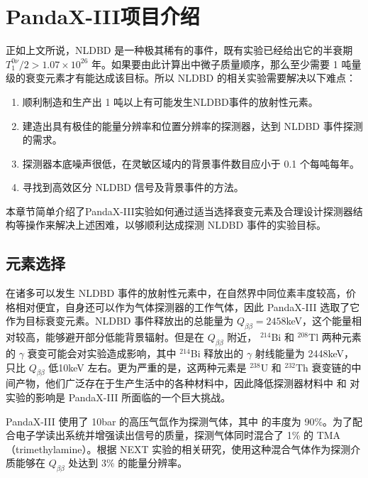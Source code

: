 \chapter{PandaX-III项目介绍}
\label{chapter:intro}

正如上文所说，NLDBD 是一种极其稀有的事件，既有实验已经给出它的半衰期 $T^{0\nu}_1/2>1.07\times10^{26}$ 年。如果要由此计算出中微子质量顺序，那么至少需要 1 吨量级的衰变元素才有能达成该目标。所以 NLDBD 的相关实验需要解决以下难点：

\vspace{0.4cm}
\begin{enumerate}
    \item 顺利制造和生产出 1 吨以上有可能发生NLDBD事件的放射性元素。
    \item 建造出具有极佳的能量分辨率和位置分辨率的探测器，达到 NLDBD 事件探测的需求。
    \item 探测器本底噪声很低，在灵敏区域内的背景事件数目应小于 0.1 个每吨每年。
    \item 寻找到高效区分 NLDBD 信号及背景事件的方法。
\end{enumerate}
\vspace{0.4cm}

本章节简单介绍了PandaX-III实验如何通过适当选择衰变元素及合理设计探测器结构等操作来解决上述困难，以够顺利达成探测 NLDBD 事件的实验目标。

\section{元素选择}

在诸多可以发生 NLDBD 事件的放射性元素中，\xeots 在自然界中同位素丰度较高，价格相对便宜，自身还可以作为气体探测器的工作气体，因此 PandaX-III 选取了它作为目标衰变元素。\xeots NLDBD 事件释放出的总能量为 $Q_{\beta\beta}=2458$keV，这个能量相对较高，能够避开部分低能背景辐射。但是在 $Q_{\beta\beta}$ 附近， $^{214}$Bi 和 $^{208}$Tl 两种元素的 $\gamma$ 衰变可能会对实验造成影响，其中 $^{214}$Bi 释放出的 $\gamma$ 射线能量为 2448keV，只比 $Q_{\beta\beta}$ 低10keV 左右。更为严重的是，这两种元素是 $^{238}$U 和 $^{232}$Th 衰变链的中间产物，他们广泛存在于生产生活中的各种材料中，因此降低探测器材料中 \utte 和 \thttt 对实验的影响是 PandaX-III 所面临的一个巨大挑战。

PandaX-III 使用了 10bar 的高压气氙作为探测气体，其中 \xeots 的丰度为 90\%。为了配合电子学读出系统并增强读出信号的质量，探测气体同时混合了 1\% 的 TMA（trimethylamine）。根据 NEXT 实验的相关研究，使用这种混合气体作为探测介质能够在 $Q_{\beta\beta}$ 处达到 3\% 的能量分辨率\supercite{azevedoh2015accurate}。

